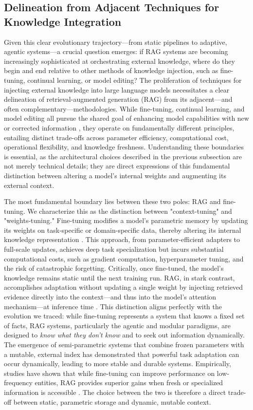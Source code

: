 \documentclass[11pt,a4paper]{article}
\begin{document}
\subsection{Delineation from Adjacent Techniques for Knowledge Integration}


Given this clear evolutionary trajectory---from static pipelines to adaptive, agentic systems---a crucial question emerges: if RAG systems are becoming increasingly sophisticated at orchestrating external knowledge, where do they begin and end relative to other methods of knowledge injection, such as fine-tuning, continual learning, or model editing? The proliferation of techniques for injecting external knowledge into large language models necessitates a clear delineation of retrieval-augmented generation (RAG) from its adjacent---and often complementary---methodologies. While fine-tuning, continual learning, and model editing all pursue the shared goal of enhancing model capabilities with new or corrected information \cite{arxiv:2403.01432v2}, they operate on fundamentally different principles, entailing distinct trade-offs across parameter efficiency, computational cost, operational flexibility, and knowledge freshness. Understanding these boundaries is essential, as the architectural choices described in the previous subsection are not merely technical details; they are direct expressions of this fundamental distinction between altering a model's internal weights and augmenting its external context.

The most fundamental boundary lies between these two poles: RAG and fine-tuning. We characterize this as the distinction between "context-tuning" and "weights-tuning." Fine-tuning modifies a model's parametric memory by updating its weights on task-specific or domain-specific data, thereby altering its internal knowledge representation \cite{arxiv:2407.13193v2}. This approach, from parameter-efficient adapters to full-scale updates, achieves deep task specialization but incurs substantial computational costs, such as gradient computation, hyperparameter tuning, and the risk of catastrophic forgetting. Critically, once fine-tuned, the model's knowledge remains static until the next training run. RAG, in stark contrast, accomplishes adaptation without updating a single weight by injecting retrieved evidence directly into the context---and thus into the model's attention mechanism---at inference time \cite{arxiv:2312.10997v5}. This distinction aligns perfectly with the evolution we traced: while fine-tuning represents a system that knows a fixed set of facts, RAG systems, particularly the agentic and modular paradigms, are designed to \emph{know what they don't know} and to seek out information dynamically. The emergence of semi-parametric systems that combine frozen parameters with a mutable, external index has demonstrated that powerful task adaptation can occur dynamically, leading to more stable and durable systems. Empirically, studies have shown that while fine-tuning can improve performance on low-frequency entities, RAG provides superior gains when fresh or specialized information is accessible \cite{arxiv:2403.01432v2}. The choice between the two is therefore a direct trade-off between static, parametric storage and dynamic, mutable context.
\end{document}
